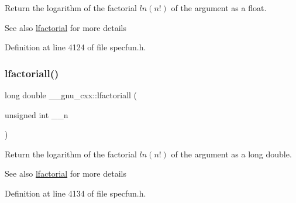 Return the logarithm of the factorial $ ln(n!) $ of the argument as a {\ttfamily float}.

\begin{DoxySeeAlso}{See also}
\hyperlink{group__gnu__math__spec__func_gab256f8d7b77b9a8fefafca21827166eb}{lfactorial} for more details 
\end{DoxySeeAlso}


Definition at line 4124 of file specfun.\+h.

\mbox{\label{group__gnu__math__spec__func_ga3a0c196f34916dc68c29c89f26cbe1ee}} 
\subsubsection{\texorpdfstring{lfactoriall()}{lfactoriall()}}
{\footnotesize\ttfamily long double \+\_\+\+\_\+gnu\+\_\+cxx\+::lfactoriall (\begin{DoxyParamCaption}\item[{unsigned int}]{\+\_\+\+\_\+n }\end{DoxyParamCaption})\hspace{0.3cm}{\ttfamily [inline]}}

Return the logarithm of the factorial $ ln(n!) $ of the argument as a {\ttfamily long double}.

\begin{DoxySeeAlso}{See also}
\hyperlink{group__gnu__math__spec__func_gab256f8d7b77b9a8fefafca21827166eb}{lfactorial} for more details 
\end{DoxySeeAlso}


Definition at line 4134 of file specfun.\+h.

\mbox{\label{group__gnu__math__spec__func_ga2032c10640d5010666d60d9faec86c32}} 

